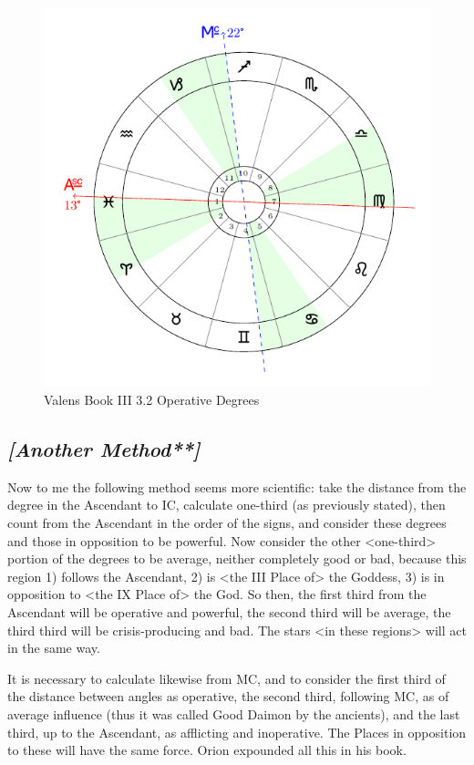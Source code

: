 \begin{figure}[H]
\includegraphics[width=\textwidth]{charts/3_02_operative_degrees}
\caption{Valens Book III 3.2 Operative Degrees}
\end{figure}

\subsection{\textit{[Another Method**]}}
Now to me the following method seems more scientific: take the distance from the degree in the Ascendant to IC, calculate one-third (as previously stated), then count from the Ascendant in the order of the signs, and consider these degrees and those in opposition to be powerful. Now consider the other <one-third> portion of the degrees to be average, neither completely good or bad, because this region 1) follows the Ascendant, 2) is <the III Place of> the Goddess, 3) is in opposition to <the IX Place of> the God. So then, the first third from the Ascendant will be operative and powerful, the second third will be average, the third third will be crisis-producing and bad. The stars <in these regions> will act in the same way.

It is necessary to calculate likewise from MC, and to consider the first third of the distance between angles as operative, the second third, following MC, as of average influence (thus it was called Good Daimon by the ancients), and the last third, up to the Ascendant, as afflicting and inoperative. The Places in opposition to these will have the same force. Orion expounded all this in his book.

